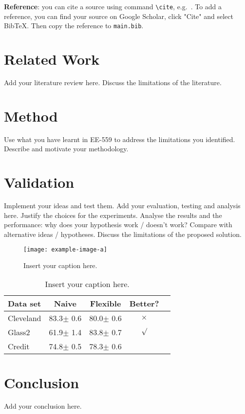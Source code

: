 \documentclass{article}
\begin{document}
\textbf{Reference}: you can cite a source using command \texttt{\textbackslash cite}, e.g.~\cite{vaswani2017attention}. 
    To add a reference, you can find your source on Google Scholar, click "Cite" and select BibTeX. Then copy the reference to \texttt{main.bib}. 
    

\section{Related Work}
\label{sec:related_work}

Add your literature review here. Discuss the limitations of the literature.

\section{Method}
\label{sec:method}

Use what you have learnt in EE-559 to address the limitations you identified. Describe and motivate your methodology. 

\section{Validation}
\label{sec:validation}

Implement your ideas and test them. Add your evaluation, testing and analysis here. Justify the choices for the experiments. Analyse the results and the performance: why does your hypothesis work / doesn’t work? Compare with alternative ideas / hypotheses. Discuss the limitations of the proposed solution.


 \begin{figure}[t!]
        \centering
        \texttt{[image: example-image-a]}
        \caption{Insert your caption here.}
        \label{fig:example}
    \end{figure}


     \begin{table}[t]
    \vskip 0.15in
    \begin{center}
    \begin{small}
    \begin{sc}
    \begin{tabular}{lcccr}
    \toprule
    Data set & Naive & Flexible & Better? \\
    \midrule
    Cleveland & 83.3$\pm$ 0.6& 80.0$\pm$ 0.6& $\times$\\
    Glass2    & 61.9$\pm$ 1.4& 83.8$\pm$ 0.7& $\surd$ \\
    Credit    & 74.8$\pm$ 0.5& 78.3$\pm$ 0.6&         \\
    \bottomrule
    \end{tabular}
    \caption{Insert your caption here.}
    \label{tab:example}
    \end{sc}
    \end{small}
    \end{center}
    \vskip -0.1in
    \end{table}
\section{Conclusion}
\label{sec:conclusion}
Add your conclusion here. 




\end{document}
